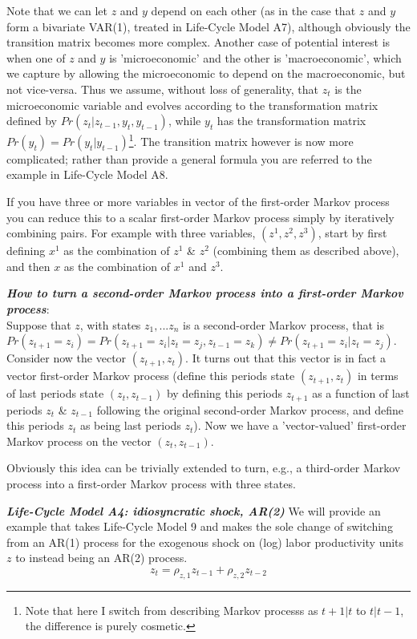 Note that we can let $z$ and $y$ depend on each other (as in the case that $z$ and $y$ form a bivariate VAR(1), treated in Life-Cycle Model A7), although obviously the transition matrix becomes more complex. Another case of potential interest is when one of $z$ and $y$ is 'microeconomic' and the other is 'macroeconomic', which we capture by allowing the microeconomic to depend on the macroeconomic, but not vice-versa. Thus we assume, without loss of generality, that $z_t$ is the microeconomic variable and evolves according to the transformation matrix defined by $Pr(z_t | z_{t-1},y_t, y_{t-1})$, while $y_t$ has the transformation matrix $Pr(y_t)=Pr(y_t|y_{t-1})$\footnote{Note that here I switch from describing Markov processs as $t+1 |t$ to $t|t-1$, the difference is purely cosmetic.}. The transition matrix however is now more complicated; rather than provide a general formula you are referred to the example in Life-Cycle Model A8.

If you have three or more variables in vector of the first-order Markov process you can reduce this to a scalar first-order Markov process simply by iteratively combining pairs. For example with three variables, $(z^1, z^2, z^3)$, start by first defining $x^1$ as the combination of $z^1$ \& $z^2$ (combining them as described above), and then $x$ as the combination of $x^1$ and $z^3$.

\textit{\textbf{How to turn a second-order Markov process into a first-order Markov process}}:
\\ \noindent Suppose that $z$, with states $z_1,...z_n$ is a second-order Markov process, that is $Pr(z_{t+1}=z_i)=Pr(z_{t+1}=z_i|z_t=z_j, z_{t-1}=z_k) \neq Pr(z_{t+1}=z_i|z_t=z_j)$. Consider now the vector $(z_{t+1}, z_t)$. It turns out that this vector is in fact a vector first-order Markov process (define this periods state $(z_{t+1}, z_t)$ in terms of last periods state $(z_t,z_{t-1})$ by defining this periods $z_{t+1}$ as a function of last periods $z_t$ \& $z_{t-1}$ following the original second-order Markov process, and define this periods $z_t$ as being last periods $z_{t}$). Now we have a 'vector-valued' first-order Markov process on the vector $(z_t,z_{t-1})$.

Obviously this idea can be trivially extended to turn, e.g., a third-order Markov process into a first-order Markov process with three states.

\textit{\textbf{Life-Cycle Model A4: idiosyncratic shock, AR(2)}}
We will provide an example that takes Life-Cycle Model 9 and makes the sole change of switching from an AR(1) process for the exogenous shock on (log) labor productivity units $z$ to instead being an AR(2) process.
\begin{equation*}
 z_t=\rho_{z,1} z_{t-1} + \rho_{z,2} z_{t-2}
\end{equation*}

